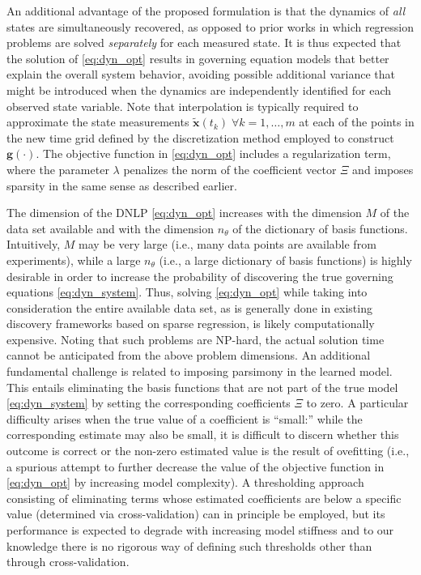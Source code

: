\documentclass[12pt]{article}
\begin{document}
An additional advantage of the proposed formulation is that the dynamics of  \textit{all} states are simultaneously recovered, as opposed to prior works \cite{brunton2016discovering, sun2020alven} in which regression problems are solved \textit{separately} for each measured state. It is thus expected that the solution of \eqref{eq:dyn_opt} results in governing equation models that better explain the overall system behavior, avoiding possible additional variance that might be introduced when the dynamics are independently identified for each observed state variable. Note that interpolation is typically required to approximate the state measurements $\tilde{\textbf{x}}(t_k)\; \forall k=1,\dots,m$ at each of the points in the new time grid defined by the discretization method employed to construct $\textbf{g}(\cdot)$. The objective function in \eqref{eq:dyn_opt} includes a regularization term, where the parameter $\lambda$ penalizes the norm of the coefficient vector $\Xi$ and imposes sparsity in the same sense as described earlier.

The dimension  of the DNLP \eqref{eq:dyn_opt} increases with the dimension $M$ of the data set available and with the dimension $n_\theta$  of the dictionary of basis functions. Intuitively, $M$ may be very large (i.e., many data points are available from experiments), while a large $n_\theta$ (i.e., a large dictionary of basis functions) is highly desirable in order to increase the probability of discovering the true governing equations \eqref{eq:dyn_system}. Thus, solving \eqref{eq:dyn_opt} while taking into consideration the entire available data set, as is generally done in existing discovery frameworks based on sparse regression\cite{brunton2016discovering,sun2020alven}, is likely computationally expensive. Noting that such problems are NP-hard, the actual solution time cannot be anticipated from the above problem dimensions. An additional fundamental challenge is related to imposing parsimony in the learned model. This entails eliminating the basis functions that are not part of the true model \eqref{eq:dyn_system} by setting the corresponding coefficients $\Xi$ to zero. A particular difficulty arises when the true value of a coefficient is ``small:'' while the corresponding estimate may also be small, it is difficult to discern whether this outcome is correct or the non-zero estimated value is the result of ovefitting (i.e., a spurious attempt to further decrease the value of the objective function in \eqref{eq:dyn_opt} by increasing model complexity). A thresholding approach consisting of eliminating terms whose estimated coefficients are below a specific value (determined via cross-validation) can in principle be employed, but its performance is expected to degrade with increasing model stiffness and to our knowledge there is no rigorous way of defining such thresholds other than through cross-validation.
\end{document}
